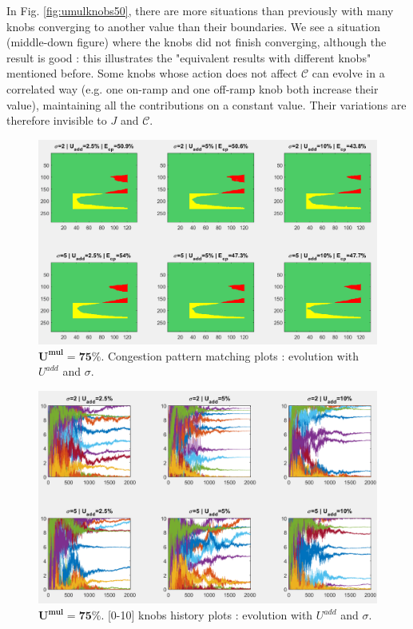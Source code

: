 In Fig. \ref{fig:umulknobs50}, there are more situations than previously with many knobs converging to another value than their  boundaries. We see a situation (middle-down figure) where the knobs did not finish converging, although the result is good : this illustrates the "equivalent results with different knobs" mentioned before. Some knobs whose action does not affect $\mathscr{C}$ can evolve in a correlated way (e.g. one on-ramp and one off-ramp knob both increase their value), maintaining all the contributions on a constant value. Their variations are therefore invisible to $J$ and $\mathscr{C}$.\\
\newpage
\begin{figure}[!h]
	\centering
	\caption{$\mathbf{U^{mul}=75\%}$. Congestion pattern matching plots : evolution with $U^{add}$ and $\sigma$.}
	\label{fig:umulcp75}
	\includegraphics[width=6.8in]{figures/results_figures/Umul/cp_Umul_75_lambda_11.png}
\end{figure}
\begin{figure}[!h]
	\centering
	\caption{$\mathbf{U^{mul}=75\%}$. [0-10] knobs history plots : evolution with $U^{add}$ and $\sigma$.}
	\label{fig:umulknobs75}
	\includegraphics[width=7in]{figures/results_figures/Umul/knobs_Umul_75_lambda_11.png}
\end{figure}	

